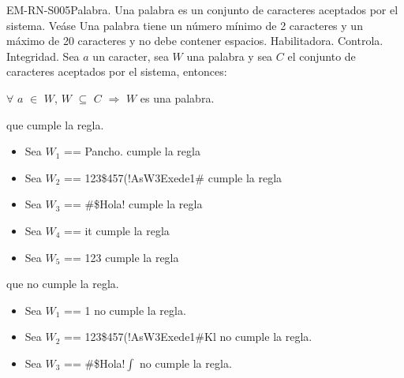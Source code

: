 \begin{BussinesRule}{EM-RN-S005}{Palabra.} 
	\BRitem[Descripción:] Una palabra es un conjunto de caracteres aceptados por el sistema.
	Veáse 
	Una palabra tiene un número mínimo de 2 caracteres y un máximo de 20 caracteres y no debe
	contener espacios.
	\BRitem[Tipo:] Habilitadora.
	\BRitem[Nivel:] Controla.
	\BRitem[Clase:] Integridad.
	\BRitem[Sentencia : ] Sea $a$ un caracter, sea $W$ una palabra y sea $C$ el conjunto de caracteres
	aceptados por el sistema, entonces:
	\begin{center}
		$\forall$ $a$ $\in$ $W$, $W$ $\subseteq$ $C$ $\Rightarrow$ $W$ es una palabra.
	\end{center}
	 que cumple la regla.
		\begin{itemize}
			\item Sea $W_{1}$ == Pancho. cumple la regla
			\item Sea $W_{2}$ == 123\$457(!AsW3Exede1\# cumple la regla
			\item Sea $W_{3}$ == \#\$Hola! cumple la regla
			\item Sea $W_{4}$ == it cumple la regla
			\item Sea $W_{5}$ == 123 cumple la regla
		\end{itemize}
	 que no cumple la regla.
		\begin{itemize}
			\item Sea $W_{1}$ == 1 no cumple la regla.
			\item Sea $W_{2}$ == 123\$457(!AsW3Exede1\#Kl no cumple la regla.
			\item Sea $W_{3}$ == \#\$Hola!$\int$ no cumple la regla.
		\end{itemize}
\end{BussinesRule}


